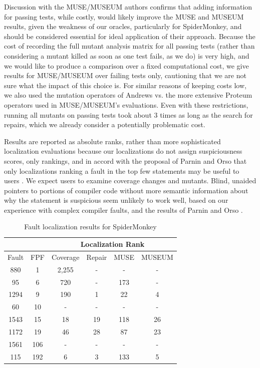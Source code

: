 Discussion with the MUSE/MUSEUM authors confirms  that adding information for passing tests, while costly, would likely improve the MUSE and MUSEUM results, given the weakness of our oracles, particularly for SpiderMonkey, and should be considered essential for ideal application of their approach.  Because the cost of recording the full mutant analysis matrix for all passing tests (rather than considering a mutant killed as soon as one test fails, as we do) is very high, and we would like to produce a comparison over a fixed computational cost, we give results for MUSE/MUSEUM over failing tests only, cautioning that we are not sure what the impact of this choice is.  For similar reasons of keeping costs low, we also used the mutation operators of Andrews vs. the more extensive Proteum \cite{Proteum} operators used in MUSE/MUSEUM's evaluations.  Even with these restrictions, running all mutants on passing tests took about 3 times as long as the search for repairs, which we already consider a potentially problematic cost.

Results are reported as absolute ranks, rather than more sophisticated \cite{MUSE} localization evaluations because our localizations do not assign suspiciousness scores, only rankings, and in accord with the proposal of Parnin and Orso that only localizations ranking a fault in the top few statements may be useful to users \cite{AutoHelp}.  We expect users to examine coverage changes and mutants.  Blind, unaided pointers to portions of compiler code without more semantic information about why the statement is suspicious seem unlikely to work well, based on our experience with complex compiler faults, and the results of Parnin and Orso \cite{AutoHelp}.

\begin{table}
\centering
{\scriptsize
\begin{tabular}{|c||c||c|c|c|c|}
\hline
& & \multicolumn{4}{|c|}{Localization Rank} \\
\hline
Fault & FPF & Coverage & Repair & MUSE & MUSEUM \\
\hline
880 & 1 & 2,255 & - & - & - \\
95 & 6 & 720 & - & 173 & -\\
1294 & 9 & 190 & 1 & 22 & 4 \\
60 & 10 & - & - & - & -\\
1543 & 15 & 18 & 19 & 118 & 26\\
1172 & 19 & 46 & 28 & 87 & 23\\
1561 & 106 & - & - & - & - \\
115 & 192 & 6 & 3 & 133 & 5 \\
\hline
\end{tabular}
}
\caption{Fault localization results for SpiderMonkey}
\label{jstable}
\end{table}

